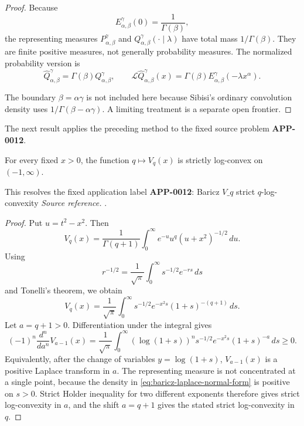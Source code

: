 \begin{proof}
Because
\[
E^\gamma_{\alpha,\beta}(0)=\frac1{\Gamma(\beta)},
\]
the representing measures \(P^\gamma_{\alpha,\beta}\) and \(Q^\gamma_{\alpha,\beta}(\cdot\mid\lambda)\) have total mass \(1/\Gamma(\beta)\). They are finite positive measures, not generally probability measures. The normalized probability version is
\[
\widehat Q^\gamma_{\alpha,\beta}=\Gamma(\beta)Q^\gamma_{\alpha,\beta},
\qquad
\mathcal L\widehat Q^\gamma_{\alpha,\beta}(x)
=\Gamma(\beta)E^\gamma_{\alpha,\beta}(-\lambda x^\alpha).
\]

The boundary \(\beta=\alpha\gamma\) is not included here because Sibisi's ordinary convolution density uses \(1/\Gamma(\beta-\alpha\gamma)\). A limiting treatment is a separate open frontier.
\end{proof}

The next result applies the preceding method to the fixed source problem \textbf{APP-0012}.
\begin{corollary}
\label{res:baricz-vq-strict-q-logconvexity}
For every fixed \(x>0\), the function \(q\mapsto V_q(x)\) is strictly log-convex on \((-1,\infty)\).

This resolves the fixed application label \textbf{APP-0012}: Baricz \(V\_q\) strict \(q\)-log-convexity
\emph{Source reference.} \cite{app-app-0012-source}.
\end{corollary}
\begin{proof}
Put \(u=t^2-x^2\).  Then
\begin{equation}
\label{eq:baricz-u-normal-form}
V_q(x)=\frac1{\Gamma(q+1)}
\int_0^\infty e^{-u}u^q(u+x^2)^{-1/2}\,du.
\end{equation}
Using
\[
r^{-1/2}=\frac1{\sqrt\pi}\int_0^\infty s^{-1/2}e^{-rs}\,ds
\]
and Tonelli's theorem, we obtain
\begin{equation}
\label{eq:baricz-laplace-normal-form}
V_q(x)=\frac1{\sqrt\pi}\int_0^\infty
s^{-1/2}e^{-x^2s}(1+s)^{-(q+1)}\,ds.
\end{equation}
Let \(a=q+1>0\).  Differentiation under the integral gives
\begin{equation}
\label{eq:baricz-complete-monotonicity}
(-1)^n\frac{d^n}{da^n}V_{a-1}(x)
=\frac1{\sqrt\pi}\int_0^\infty
(\log(1+s))^n s^{-1/2}e^{-x^2s}(1+s)^{-a}\,ds\ge0.
\end{equation}
Equivalently, after the change of variables \(y=\log(1+s)\), \(V_{a-1}(x)\) is a positive Laplace transform in \(a\).  The representing measure is not concentrated at a single point, because the density in \eqref{eq:baricz-laplace-normal-form} is positive on \(s>0\).  Strict Holder inequality for two different exponents therefore gives strict log-convexity in \(a\), and the shift \(a=q+1\) gives the stated strict log-convexity in \(q\).
\end{proof}

